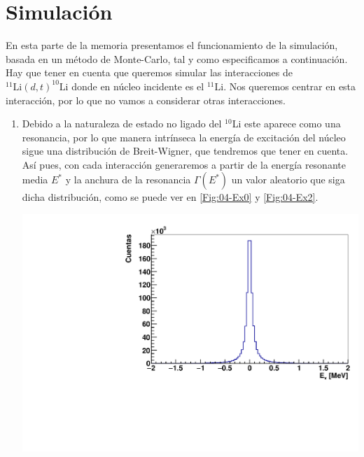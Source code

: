 \section{Simulación }

En esta parte de la memoria presentamos el funcionamiento de la simulación, basada en un método de Monte-Carlo, tal y como especificamos a continuación. Hay que tener en cuenta que queremos simular las interacciones de $^{11}\text{Li}(d,t)^{10}\text{Li}$ donde en núcleo incidente es el $^{11}\text{Li}$. Nos queremos centrar en esta interacción, por lo que no vamos a considerar otras interacciones.

\begin{enumerate}

    \item  Debido a la naturaleza de estado no ligado del $^{10}$Li este aparece como una resonancia, por lo que manera intrínseca la energía de excitación del núcleo sigue una distribución de Breit-Wigner, que tendremos que tener en cuenta. Así pues, con cada interacción generaremos a partir de la energía resonante media $E^*$ y la anchura de la resonancia $\Gamma(E^*)$ un valor aleatorio que siga dicha distribución, como se puede ver en \cref{Fig:04-Ex0} y \cref{Fig:04-Ex2}.
    

    \begin{minipage}{0.49\linewidth} \centering
        \includegraphics[width=1.0\linewidth]{Imagenes/ExHisto/ExSampled_Ex0.00_incIdx0.pdf} 


\end{minipage}
\end{enumerate}
